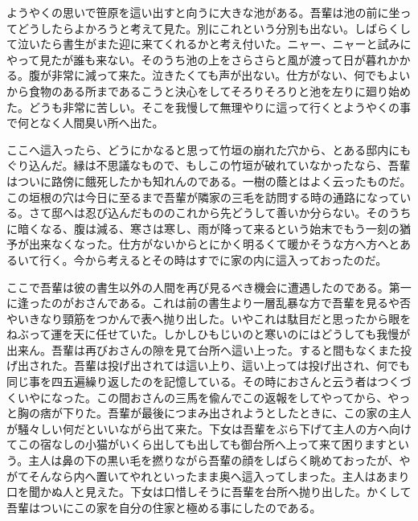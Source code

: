 \documentclass[a4paper,10pt]{ltjsarticle}
\begin{document}
ようやくの思いで笹原を這い出すと向うに大きな池がある。吾輩は池の前に坐ってどうしたらよかろうと考えて見た。別にこれという分別も出ない。しばらくして泣いたら書生がまた迎に来てくれるかと考え付いた。ニャー、ニャーと試みにやって見たが誰も来ない。そのうち池の上をさらさらと風が渡って日が暮れかかる。腹が非常に減って来た。泣きたくても声が出ない。仕方がない、何でもよいから食物のある所まであるこうと決心をしてそろりそろりと池を左りに廻り始めた。どうも非常に苦しい。そこを我慢して無理やりに這って行くとようやくの事で何となく人間臭い所へ出た。

ここへ這入ったら、どうにかなると思って竹垣の崩れた穴から、とある邸内にもぐり込んだ。縁は不思議なもので、もしこの竹垣が破れていなかったなら、吾輩はついに路傍に餓死したかも知れんのである。一樹の蔭とはよく云ったものだ。この垣根の穴は今日に至るまで吾輩が隣家の三毛を訪問する時の通路になっている。さて邸へは忍び込んだもののこれから先どうして善いか分らない。そのうちに暗くなる、腹は減る、寒さは寒し、雨が降って来るという始末でもう一刻の猶予が出来なくなった。仕方がないからとにかく明るくて暖かそうな方へ方へとあるいて行く。今から考えるとその時はすでに家の内に這入っておったのだ。

ここで吾輩は彼の書生以外の人間を再び見るべき機会に遭遇したのである。第一に逢ったのがおさんである。これは前の書生より一層乱暴な方で吾輩を見るや否やいきなり頸筋をつかんで表へ抛り出した。いやこれは駄目だと思ったから眼をねぶって運を天に任せていた。しかしひもじいのと寒いのにはどうしても我慢が出来ん。吾輩は再びおさんの隙を見て台所へ這い上った。すると間もなくまた投げ出された。吾輩は投げ出されては這い上り、這い上っては投げ出され、何でも同じ事を四五遍繰り返したのを記憶している。その時におさんと云う者はつくづくいやになった。この間おさんの三馬を偸んでこの返報をしてやってから、やっと胸の痞が下りた。吾輩が最後につまみ出されようとしたときに、この家の主人が騒々しい何だといいながら出て来た。下女は吾輩をぶら下げて主人の方へ向けてこの宿なしの小猫がいくら出しても出しても御台所へ上って来て困りますという。主人は鼻の下の黒い毛を撚りながら吾輩の顔をしばらく眺めておったが、やがてそんなら内へ置いてやれといったまま奥へ這入ってしまった。主人はあまり口を聞かぬ人と見えた。下女は口惜しそうに吾輩を台所へ抛り出した。かくして吾輩はついにこの家を自分の住家と極める事にしたのである。
\end{document}
